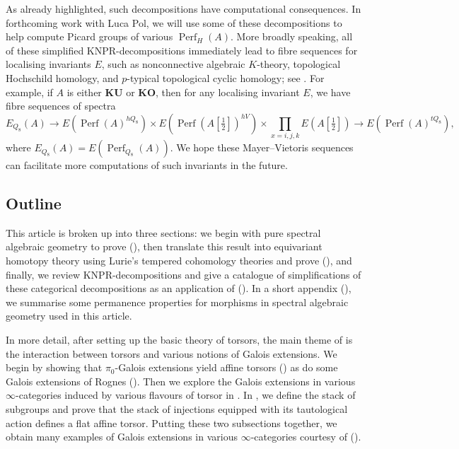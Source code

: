 \documentclass[11pt, a4paper]{article}
\newcommand{\1}{\mathbf{1}}
\newcommand{\gKU}{{\mathbf{KU}}}
\newcommand{\gKO}{{\mathbf{KO}}}
\DeclareMathOperator{\Perf}{Perf}
\theoremstyle{plain}
\theoremstyle{definition}
\theoremstyle{remark}\numberwithin{equation}{section}
\begin{document}
As already highlighted, such decompositions have computational consequences. In forthcoming work with Luca Pol, we will use some of these decompositions to help compute Picard groups of various $\Perf_H(A)$. More broadly speaking, all of these simplified KNPR-decompositions immediately lead to fibre sequences for localising invariants $E$, such as nonconnective algebraic $K$-theory, topological Hochschild homology, and $p$-typical topological cyclic homology; see . For example, if $A$ is either $\gKU$ or $\gKO$, then for any localising invariant $E$, we have fibre sequences of spectra
    \[E_{Q_8}(A) \to E(\Perf(A)^{hQ_8}) \times E(\Perf(A[\tfrac{1}{2}])^{hV}) \times \prod_{x=i,j,k} E(A[\tfrac{1}{2}]) \to E(\Perf(A)^{tQ_8}),\]
where $E_{Q_8}(A)=E(\Perf_{Q_8}(A))$. We hope these Mayer--Vietoris sequences can facilitate more computations of such invariants in the future.

\subsection*{Outline}
This article is broken up into three sections: we begin with pure spectral algebraic geometry to prove  (), then translate this result into equivariant homotopy theory using Lurie's tempered cohomology theories and prove  (), and finally, we review KNPR-decompositions and give a catalogue of simplifications of these categorical decompositions as an application of  (). In a short appendix (), we summarise some permanence properties for morphisms in spectral algebraic geometry used in this article.

In more detail, after setting up the basic theory of torsors, the main theme of  is the interaction between torsors and various notions of Galois extensions. We begin by showing that $\pi_0$-Galois extensions yield affine torsors () as do some Galois extensions of Rognes (). Then we explore the Galois extensions in various $\infty$-categories induced by various flavours of torsor in . In , we define the stack of subgroups and prove  that the stack of injections equipped with its tautological action defines a flat affine torsor. Putting these two subsections together, we obtain many examples of Galois extensions in various $\infty$-categories courtesy of  ().
\end{document}
